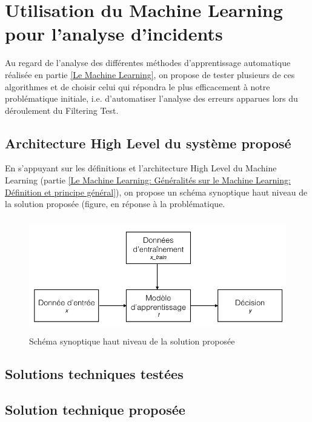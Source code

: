 \chapter{Utilisation du Machine Learning pour l'analyse d'incidents}
\label{Utilisation du Machine Learning pour l'analyse d'incidents}
\thispagestyle{fancy}

Au regard de l'analyse des différentes méthodes d'apprentissage automatique réalisée en partie \ref{Le Machine Learning}, on propose de tester plusieurs de ces algorithmes et de choisir celui qui répondra le plus efficacement à notre problématique initiale, i.e. d'automatiser l'analyse des erreurs apparues lors du déroulement du Filtering Test.

\section{Architecture High Level du système proposé}
\label{Utilisation du Machine Learning pour l'analyse d'incidents: Achitecture High Level du système proposé}
En s'appuyant sur les définitions et l'architecture High Level du Machine Learning (partie \ref{Le Machine Learning: Généralités sur le Machine Learning: Définition et principe général}), on propose un schéma synoptique haut niveau de la solution proposée (figure, en réponse à la problématique. 

\begin{figure}[h]
	\centering\includegraphics[height=5cm]{images/ML_high_level.jpeg}
	\caption{Schéma synoptique haut niveau de la solution proposée}
	\label{fig:Schéma synoptique haut niveau de la solution proposée}
\end{figure}

\section{Solutions techniques testées}
\label{Utilisation du Machine Learning pour l'analyse d'incidents: Solutions techniques testées}




\section{Solution technique proposée}
\label{Utilisation du Machine Learning pour l'analyse d'incidents: Solution technique proposée}

